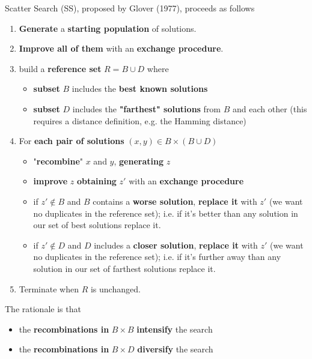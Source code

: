 Scatter Search (SS), proposed by Glover (1977), proceeds as follows
\begin{enumerate}
	\item \textbf{Generate} a \textbf{starting population} of solutions.\\
	
	\item \textbf{Improve all of them} with an \textbf{exchange procedure}.\\
	
	\item build a \textbf{reference set} $R = B \cup D$ where
	\begin{itemize}
		\item \textbf{subset} $B$ includes the \textbf{best known solutions}
		\item \textbf{subset} $D$ includes the \textbf{"farthest" solutions} from $B$ and each other (this requires a distance definition, e.g. the Hamming distance)
	\end{itemize}
	\nn
	
	\item For \textbf{each pair of solutions} $(x, y ) \in B \times (B \cup D)$
	\begin{itemize}
		\item "\textbf{recombine}" $x$ and $y$, \textbf{generating} $z$
		
		\item \textbf{improve} $z$ \textbf{obtaining} $z'$ with an \textbf{exchange procedure}
		
		\item if $z' \notin B$ and $B$ contains a \textbf{worse solution}, \textbf{replace it} with $z'$ (we want no duplicates in the reference set); i.e. if it's better than any solution in our set of best solutions replace it.
		
		\item if $z' \notin D$ and $D$ includes a \textbf{closer solution}, \textbf{replace it} with $z'$ (we want no duplicates in the reference set); i.e. if it's further away than any solution in our set of farthest solutions replace it.
	\end{itemize}
	\nn
	
	\item Terminate when $R$ is unchanged.\\
\end{enumerate}

The rationale is that
\begin{itemize}
	\item the \textbf{recombinations in} $B \times B$ \textbf{intensify} the search
	
	\item the \textbf{recombinations in} $B \times D$ \textbf{diversify} the search
\end{itemize}

